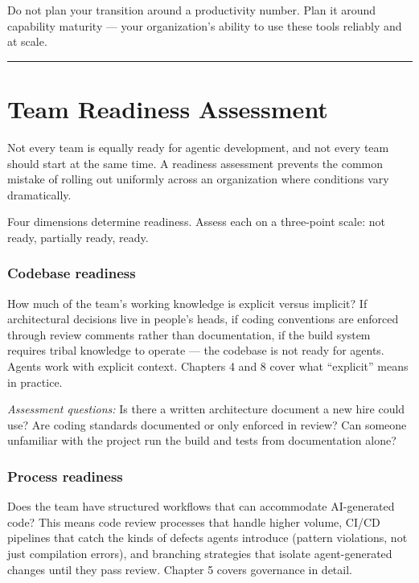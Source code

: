 \documentclass[
  a4paper,
  DIV=11,
  numbers=noendperiod]{scrreprt}
\begin{document}
Do not plan your transition around a productivity number. Plan it around
capability maturity --- your organization's ability to use these tools
reliably and at scale.

\begin{center}\rule{0.5\linewidth}{0.5pt}\end{center}

\section{Team Readiness Assessment}\label{team-readiness-assessment}

Not every team is equally ready for agentic development, and not every
team should start at the same time. A readiness assessment prevents the
common mistake of rolling out uniformly across an organization where
conditions vary dramatically.

Four dimensions determine readiness. Assess each on a three-point scale:
not ready, partially ready, ready.

\subsubsection{Codebase readiness}\label{codebase-readiness}

How much of the team's working knowledge is explicit versus implicit? If
architectural decisions live in people's heads, if coding conventions
are enforced through review comments rather than documentation, if the
build system requires tribal knowledge to operate --- the codebase is
not ready for agents. Agents work with explicit context. Chapters 4 and
8 cover what ``explicit'' means in practice.

\emph{Assessment questions:} Is there a written architecture document a
new hire could use? Are coding standards documented or only enforced in
review? Can someone unfamiliar with the project run the build and tests
from documentation alone?

\subsubsection{Process readiness}\label{process-readiness}

Does the team have structured workflows that can accommodate
AI-generated code? This means code review processes that handle higher
volume, CI/CD pipelines that catch the kinds of defects agents introduce
(pattern violations, not just compilation errors), and branching
strategies that isolate agent-generated changes until they pass review.
Chapter 5 covers governance in detail.
\end{document}
